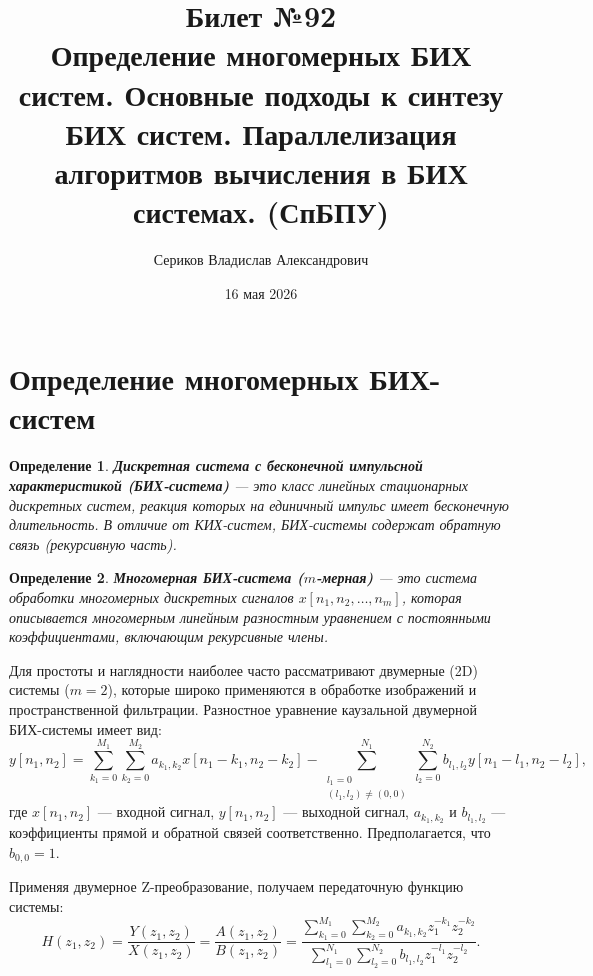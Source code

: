 \documentclass[12pt,a4paper]{article}
\title{Билет №92 \\ \small Определение многомерных БИХ систем. Основные подходы к синтезу БИХ систем. Параллелизация алгоритмов вычисления в БИХ системах. (СпБПУ)}
\author{Сериков Владислав Александрович}
\date{16 мая 2026}
\newtheorem{definition}{Определение}
\begin{document}
\maketitle
\tableofcontents
\newpage

\section{Определение многомерных БИХ-систем}

\begin{definition}
\textbf{Дискретная система с бесконечной импульсной характеристикой (БИХ-система)} — это класс линейных стационарных дискретных систем, реакция которых на единичный импульс имеет бесконечную длительность. В отличие от КИХ-систем, БИХ-системы содержат обратную связь (рекурсивную часть).
\end{definition}

\begin{definition}
\textbf{Многомерная БИХ-система ($m$-мерная)} — это система обработки многомерных дискретных сигналов $x[n_1, n_2, \dots, n_m]$, которая описывается многомерным линейным разностным уравнением с постоянными коэффициентами, включающим рекурсивные члены.
\end{definition}

Для простоты и наглядности наиболее часто рассматривают двумерные (2D) системы ($m=2$), которые широко применяются в обработке изображений и пространственной фильтрации. Разностное уравнение каузальной двумерной БИХ-системы имеет вид:
\begin{equation}
    y[n_1, n_2] = \sum_{k_1=0}^{M_1} \sum_{k_2=0}^{M_2} a_{k_1, k_2} x[n_1-k_1, n_2-k_2] - \sum_{\substack{l_1=0 \\ (l_1, l_2) \neq (0,0)}}^{N_1} \sum_{l_2=0}^{N_2} b_{l_1, l_2} y[n_1-l_1, n_2-l_2],
\end{equation}
где $x[n_1, n_2]$ — входной сигнал, $y[n_1, n_2]$ — выходной сигнал, $a_{k_1, k_2}$ и $b_{l_1, l_2}$ — коэффициенты прямой и обратной связей соответственно. Предполагается, что $b_{0,0} = 1$.

Применяя двумерное Z-преобразование, получаем передаточную функцию системы:
\begin{equation}
    H(z_1, z_2) = \frac{Y(z_1, z_2)}{X(z_1, z_2)} = \frac{A(z_1, z_2)}{B(z_1, z_2)} = \frac{\sum_{k_1=0}^{M_1} \sum_{k_2=0}^{M_2} a_{k_1, k_2} z_1^{-k_1} z_2^{-k_2}}{\sum_{l_1=0}^{N_1} \sum_{l_2=0}^{N_2} b_{l_1, l_2} z_1^{-l_1} z_2^{-l_2}}.
\end{equation}
\end{document}
